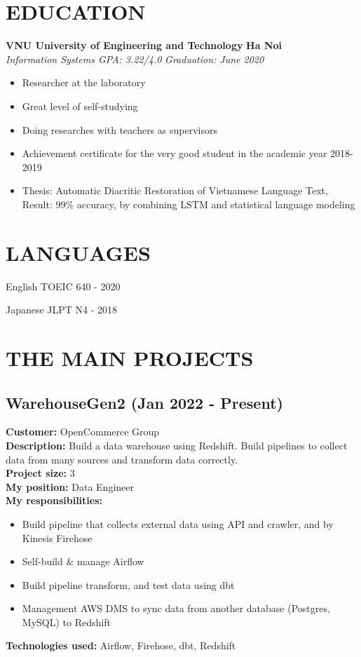 \documentclass[11pt,a4paper,roman]{moderncv}
\newcommand*{\customcventry}[6][.25em]{%
    {\bfseries #4} \hfill {\bfseries #5} \\
    {\itshape #3} \hfill {\itshape #2}
    \ifx\relax#6\relax\else\\#6\fi
    \par\addvspace{#1}}
\newcommand*{\customcvprojectt}[3][.25em]{%
    #2 \hfill #3
    \par\addvspace{#1}}
\begin{document}
    \section{EDUCATION}
    \customcventry{Graduation: June 2020}{Information Systems GPA: 3.22/4.0}{VNU University of Engineering and Technology}{Ha Noi}{}
    \begin{itemize}
        \item Researcher at the laboratory
        \item Great level of self-studying
        \item Doing researches with teachers as supervisors
        \item Achievement certificate for the very good student in the academic year 2018-2019
        \item Thesis: Automatic Diacritic Restoration of Vietnamese Language Text, Result: 99\% accuracy, by combining LSTM and statistical language modeling
    \end{itemize}

    \section{LANGUAGES}
    \customcvprojectt{English}{TOEIC 640 - 2020}
    \customcvprojectt{Japanese}{JLPT N4 - 2018}

    \newpage

    \section{THE MAIN PROJECTS}

    \subsection{WarehouseGen2 (Jan 2022 - Present)}
    \textbf{Customer:} OpenCommerce Group \\
    \textbf{Description:} Build a data warehouse using Redshift. Build pipelines to collect data from many sources and transform data correctly. \\
    \textbf{Project size:} 3 \\
    \textbf{My position:} Data Engineer \\
    \textbf{My responsibilities:}
    \begin{itemize}
        \item Build pipeline that collects external data using API and crawler, and by Kinesis Firehose
        \item Self-build \& manage Airflow
        \item Build pipeline transform, and test data using dbt
        \item Management AWS DMS to sync data from another database (Postgres, MySQL) to Redshift
    \end{itemize}
    \textbf{Technologies used:} Airflow, Firehose, dbt, Redshift
\end{document}
